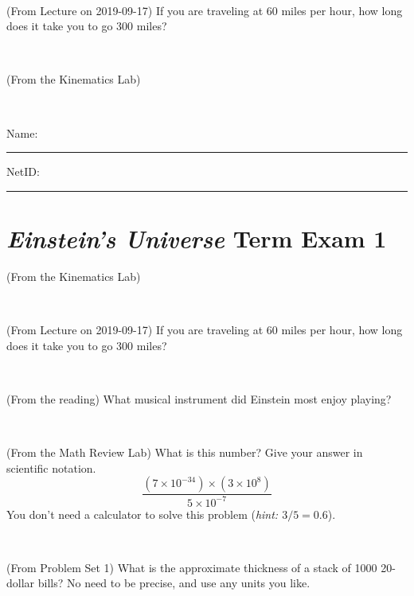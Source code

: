 \documentclass[12pt, letterpaper]{article}
\begin{document}
\vfill ~

\begin{problem} (From Lecture on 2019-09-17)
If you are traveling at 60 miles per hour, how long does
it take you to go 300 miles?
\end{problem}


\vfill ~

\begin{problem} (From the Kinematics Lab)

\end{problem}


\vfill ~


\cleardoublepage



\noindent
Name: \rule[-1ex]{0.60\textwidth}{0.1pt}
NetID: \rule[-1ex]{0.20\textwidth}{0.1pt}

\section*{\textsl{Einstein's Universe} Term Exam 1}
\setcounter{problem}{1}


\begin{problem} (From the Kinematics Lab)

\end{problem}


\vfill ~

\begin{problem} (From Lecture on 2019-09-17)
If you are traveling at 60 miles per hour, how long does
it take you to go 300 miles?
\end{problem}


\vfill ~

\begin{problem} (From the reading)
What musical instrument did Einstein most enjoy playing?
\end{problem}


\vfill ~

\begin{problem} (From the Math Review Lab)
What is this number? Give your answer in scientific notation.
$$
\frac{(7\times10^{-34})\times(3\times10^8)}{5\times10^{-7}}
$$
You don't need a calculator to solve this problem (\textit{hint: $3/5=0.6$}).
\end{problem}


\vfill ~


\clearpage


\begin{problem} (From Problem Set 1)
What is the approximate thickness of a stack of 1000 20-dollar bills?
No need to be precise, and use any units you like.
\end{problem}
\end{document}
